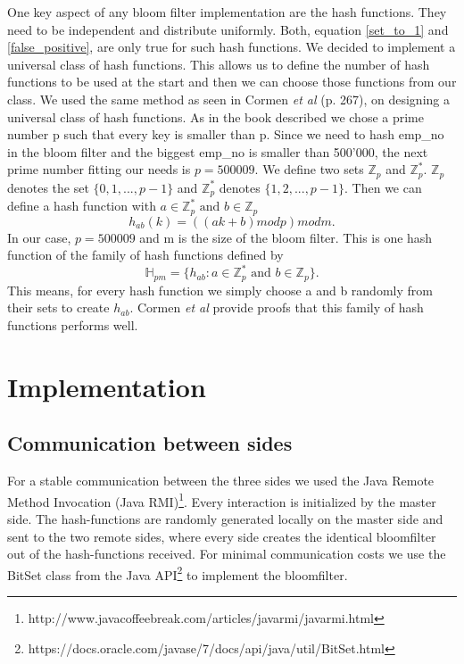 \documentclass[12]{scrartcl}
\begin{document}
One key aspect of any bloom filter implementation are the hash functions. They need to be independent and distribute uniformly. Both, equation \ref{set_to_1} and \ref{false_positive}, are only true for such hash functions. We decided to implement a universal class of hash functions. This allows us to define the number of hash functions to be used at the start and then we can choose those functions from our class. We used the same method as seen in Cormen {\em et al}\cite{cormen} (p. 267), on designing a universal class of hash functions. As in the book described we chose a prime number p such that every key is smaller than p. Since we need to hash emp\_no in the bloom filter and the biggest emp\_no is smaller than 500'000, the next prime number fitting our needs is $p = 500009$. We define two sets $\mathbb{Z}_p$ and $\mathbb{Z}_p^*$. $\mathbb{Z}_p$ denotes the set $\{0,1,...,p-1\}$ and $\mathbb{Z}_p^*$ denotes $\{1,2,...,p-1\}$. Then we can define a hash function with $a \in \mathbb{Z}_p^* \text{ and } b \in \mathbb{Z}_p$
\begin{equation}
	h_{ab}(k) = ((ak + b) \mathrel{mod} p) \mathrel{mod} m.
\end{equation}
In our case, $p = 500009$ and m is the size of the bloom filter. This is one hash function of the family of hash functions defined by
\begin{equation}
\mathbb{H}_{pm} = \{h_{ab} \mathrel{:} a \in \mathbb{Z}_p^* \text{ and } b \in \mathbb{Z}_p\}.
\end{equation}
This means, for every hash function we simply choose a and b randomly from their sets to create $h_{ab}$. Cormen {\em et al}\cite{cormen} provide proofs that this family of hash functions performs well.

\section{Implementation}

\subsection{Communication between sides}
For a stable communication between the three sides we used the Java Remote Method Invocation (Java RMI)\footnote{http://www.javacoffeebreak.com/articles/javarmi/javarmi.html}. Every interaction is initialized by the master side.
The hash-functions are randomly generated locally on the master side and sent to the two remote sides, where every side creates the identical bloomfilter out of the hash-functions received. For minimal communication costs we use the BitSet class from the Java API\footnote{https://docs.oracle.com/javase/7/docs/api/java/util/BitSet.html} to implement the bloomfilter. 
\end{document}
